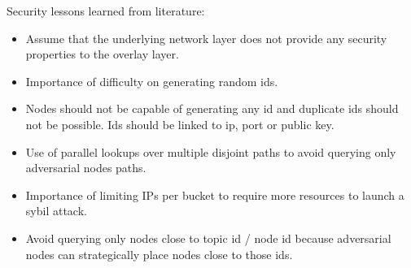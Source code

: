 



Security lessons learned from literature:
\begin{itemize}
\item Assume that the underlying network layer does not provide any security properties to the overlay layer.
\item Importance of difficulty on generating random ids.
\item Nodes should not be capable of generating any id and duplicate ids should not be possible. Ids should be linked to ip, port or public key.
\item Use of parallel lookups over multiple disjoint paths to avoid querying only  adversarial nodes paths.
\item Importance of limiting IPs per bucket to require more resources to launch a sybil attack.
\item Avoid querying only nodes close to topic id / node id because adversarial nodes can strategically place nodes close to those ids.
\end{itemize}

